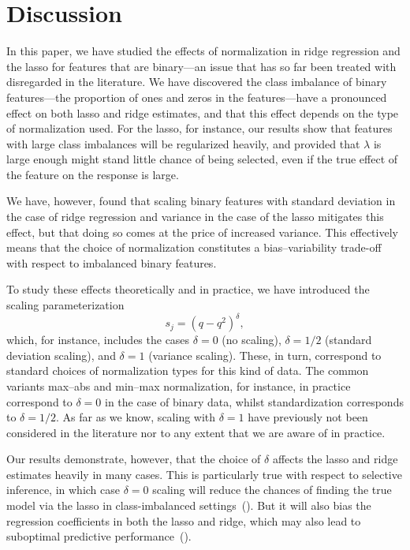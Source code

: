 \section{Discussion}\label{sec:discussion}

In this paper, we have studied the effects of normalization in ridge regression and the
lasso for features that are binary---an issue that has so far been treated with disregarded
in the literature. We have discovered the class imbalance of binary features---the
proportion of ones and zeros in the features---have a pronounced effect on both lasso and
ridge estimates, and that this effect depends on the type of normalization used. For the
lasso, for instance, our results show that features with large class imbalances will be
regularized heavily, and provided that \(\lambda\) is large enough might stand little
chance of being selected, even if the true effect of the feature on the response is large.

We have, however, found that scaling binary features with standard deviation in the case of
ridge regression and variance in the case of the lasso mitigates this effect, but that
doing so comes at the price of increased variance. This effectively means that the choice
of normalization constitutes a bias--variability trade-off with respect to imbalanced
binary features.

To study these effects theoretically and in practice, we have introduced the scaling
parameterization
\[
  s_j = (q - q^2)^\delta,
\]
which, for instance, includes the cases \(\delta=0\) (no scaling), \(\delta = 1/2\)
(standard deviation scaling), and \(\delta=1\) (variance scaling). These, in turn,
correspond to standard choices of normalization types for this kind of data. The common
variants max--abs and min--max normalization, for instance, in practice correspond to
\(\delta = 0\) in the case of binary data, whilst standardization corresponds to \(\delta =
1/2\). As far as we know, scaling with \(\delta=1\) have previously not been considered in
the literature nor to any extent that we are aware of in practice.

Our results demonstrate, however, that the choice of \(\delta\) affects the lasso and ridge
estimates heavily in many cases. This is particularly true with respect to selective
inference, in which case \(\delta=0\) scaling will reduce the chances of finding the true
model via the lasso in class-imbalanced settings~(). But it
will also bias the regression coefficients in both the lasso and ridge, which may also lead
to suboptimal predictive performance~().

